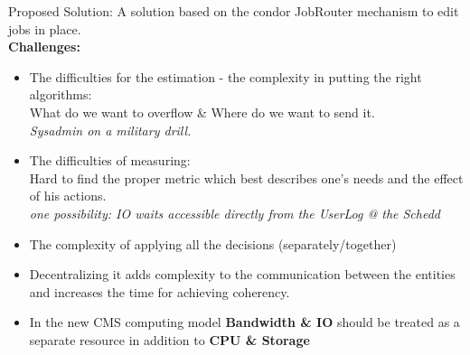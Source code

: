 \documentclass[8pt,mathserif,a4paper,oneside,pdf]{beamer}
\begin{document}
\begin{frame}[fragile]{Proposed Solution: }
  A solution based on the condor JobRouter mechanism to edit jobs in place.\\
  \textbf{Challenges:}
  \begin{itemize}
  \item
    The difficulties for the estimation - the complexity in putting the right algorithms:\\
    What do we want to overflow \& Where do we want to send it.\\
    \textit{Sysadmin on a military drill.}
  \item
    The difficulties of measuring:\\
    Hard to find the proper metric which best describes one's needs and the effect of his actions.\\
    \textit{one possibility: IO waits accessible directly from the UserLog @ the Schedd}
  \item
    The complexity of applying all the decisions (separately/together)
  \item
    Decentralizing it adds complexity to the communication between the entities and increases the time for achieving coherency.
  \item
    In the new CMS computing model \textbf{Bandwidth \& IO} should be treated as a separate resource in addition to \textbf{CPU \& Storage}
  \end{itemize}

\end{frame}
\end{document}
